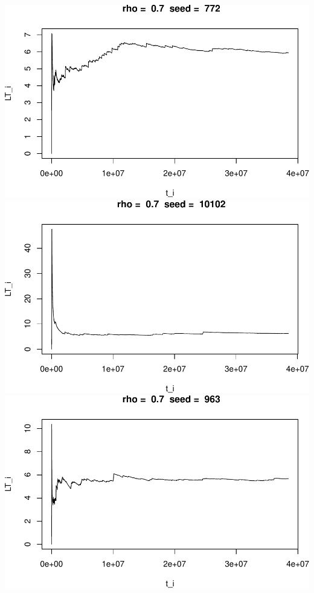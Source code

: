 \documentclass[]{article}
\begin{document}
\includegraphics{003_files/figure-latex/unnamed-chunk-18-1.pdf}
\includegraphics{003_files/figure-latex/unnamed-chunk-18-2.pdf}
\includegraphics{003_files/figure-latex/unnamed-chunk-18-3.pdf}
\end{document}
